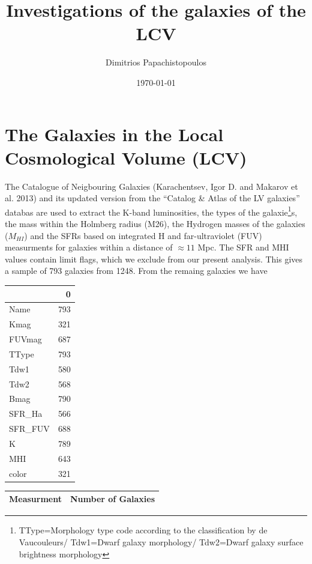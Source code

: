 \documentclass[a4paper,twocolumn]{article}
\author{Dimitrios Papachistopoulos}
\date{\today}
\title{Investigations of the galaxies of the LCV}
\begin{document}
\maketitle

\section{The Galaxies in the Local Cosmological Volume (LCV)}
\label{sec:org50829b4}

The Catalogue of Neigbouring Galaxies (Karachentsev, Igor D. and Makarov  et al. 2013\autocite{karachentsevUPDATEDNEARBYGALAXY2013}) and its updated version from the ``Catalog \& Atlas of the LV galaxies'' databas\autocite{CatalogLVGalaxies}  are used to extract the K-band luminosities, the types of the galaxie\footnote{TType=Morphology type code according to the classification by de Vaucouleurs/ Tdw1=Dwarf galaxy morphology/ Tdw2=Dwarf galaxy surface brightness morphology}s, the mass within the Holmberg radius (M26), the Hydrogen masses of the galaxies (\(M_{HI}\)) and the SFRs based on integrated  H and far-ultraviolet (FUV) measurments for galaxies within a distance of
\(\approx 11\) Mpc. The SFR and MHI values contain limit flags, which we exclude from our present analysis. This gives a sample of 793 galaxies from 1248. From the remaing galaxies we have

\begin{table}[hc]
\centering
\begin{tabular}{lr}
\toprule
{} &    0 \\
\midrule
Name    &  793 \\
Kmag    &  321 \\
FUVmag  &  687 \\
TType   &  793 \\
Tdw1    &  580 \\
Tdw2    &  568 \\
Bmag    &  790 \\
SFR\_Ha  &  566 \\
SFR\_FUV &  688 \\
K       &  789 \\
MHI     &  643 \\
color   &  321 \\
\bottomrule
\end{tabular}
\end{table}

\begin{center}
\begin{tabular}{|l|l|}
\hline
Measurment & Number of Galaxies \\
\hline
\end{tabular}
\end{center}
\end{document}
